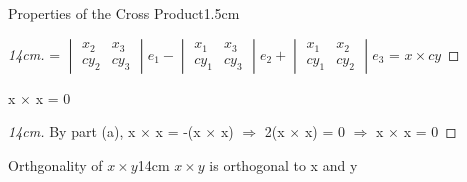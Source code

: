 \begin{ltheorem}{Properties of the Cross Product}{1.5cm}
\begin{proof}[14cm]
                \hspace{1.5cm}
                = $\begin{vmatrix}
                    x_2 & x_3 \\
                    cy_2 & cy_3 
                \end{vmatrix}e_1
                - \begin{vmatrix}
                    x_1 & x_3 \\
                    cy_1 & cy_3 
                \end{vmatrix}e_2
                + \begin{vmatrix}
                    x_1 & x_2 \\
                    cy_1 & cy_2 
                \end{vmatrix}e_3$
                = $x \times cy$
            \end{proof}

        \item x $\times$ x = 0
        
            \begin{proof}[14cm]
                By part (a),
                x $\times$ x = -(x $\times$ x)
                \hspace{0.5cm}
                $\Rightarrow$
                \hspace{0.5cm}
                2(x $\times$ x) = 0
                \hspace{0.5cm}
                $\Rightarrow$
                \hspace{0.5cm}
                x $\times$ x = 0
            \end{proof}
    \end{ltheorem}

    \newpage



    \begin{wtheorem}{Orthgonality of $x \times y$}{14cm}
        $x \times y$ is orthogonal to x and y
    \end{wtheorem}

